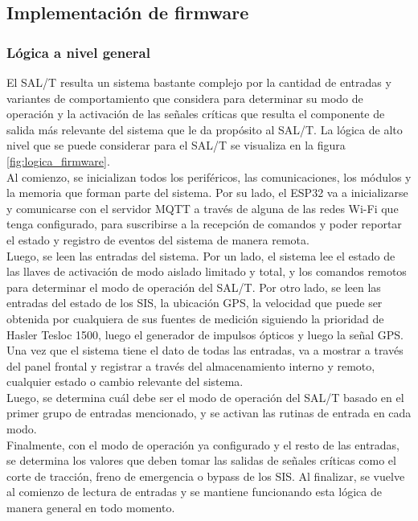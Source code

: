 \subsection{Implementación de firmware}

\subsubsection{Lógica a nivel general}


El SAL/T resulta un sistema bastante complejo por la cantidad de entradas y variantes de comportamiento que considera para determinar su modo de operación y la activación de las señales críticas que resulta el componente de salida más relevante del sistema que le da propósito al SAL/T. La lógica de alto nivel que se puede considerar para el SAL/T se visualiza en la figura \ref{fig:logica_firmware}.  \\


Al comienzo, se inicializan todos los periféricos, las comunicaciones, los módulos y la memoria que forman parte del sistema. Por su lado, el ESP32 va a inicializarse y comunicarse con el servidor MQTT a través de alguna de las redes Wi-Fi que tenga configurado, para suscribirse a la recepción de comandos y poder reportar el estado y registro de eventos del sistema de manera remota. \\

Luego, se leen las entradas del sistema. Por un lado, el sistema lee el estado de las llaves de activación de modo aislado limitado y total, y los comandos remotos para determinar el modo de operación del SAL/T. Por otro lado, se leen las entradas del estado de los SIS, la ubicación GPS, la velocidad que puede ser obtenida por cualquiera de sus fuentes de medición siguiendo la prioridad de Hasler Tesloc 1500, luego el generador de impulsos ópticos y luego la señal GPS. \\ 

Una vez que el sistema tiene el dato de todas las entradas, va a mostrar a través del panel frontal y registrar a través del almacenamiento interno y remoto, cualquier estado o cambio relevante del sistema. \\ 

Luego, se determina cuál debe ser el modo de operación del SAL/T basado en el primer grupo de entradas mencionado, y se activan las rutinas de entrada en cada modo. \\

Finalmente, con el modo de operación ya configurado y el resto de las entradas, se determina los valores que deben tomar las salidas de señales críticas como el corte de tracción, freno de emergencia o bypass de los SIS. Al finalizar, se vuelve al comienzo de lectura de entradas y se mantiene funcionando esta lógica de manera general en todo momento. 


